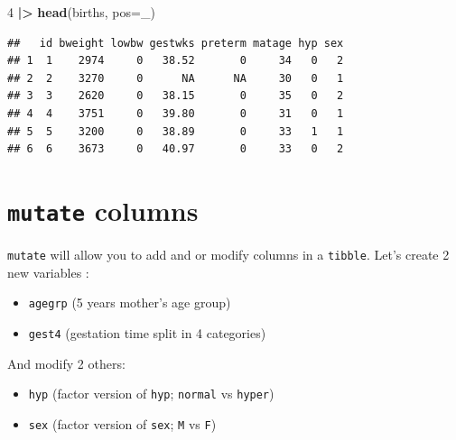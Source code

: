 \documentclass[
]{book}
\newenvironment{Shaded}{\begin{snugshade}}{\end{snugshade}}
\newcommand{\AttributeTok}[1]{\textcolor[rgb]{0.13,0.29,0.53}{#1}}
\newcommand{\DecValTok}[1]{\textcolor[rgb]{0.00,0.00,0.81}{#1}}
\newcommand{\FunctionTok}[1]{\textcolor[rgb]{0.13,0.29,0.53}{\textbf{#1}}}
\newcommand{\NormalTok}[1]{#1}
\newcommand{\SpecialCharTok}[1]{\textcolor[rgb]{0.81,0.36,0.00}{\textbf{#1}}}
\providecommand{\tightlist}{%
  \setlength{\itemsep}{0pt}\setlength{\parskip}{0pt}}
\theoremstyle{definition}
\theoremstyle{definition}
\theoremstyle{definition}
\theoremstyle{definition}
\theoremstyle{remark}
\begin{document}
\begin{Shaded}
\begin{Highlighting}[]
\DecValTok{4} \SpecialCharTok{|\textgreater{}} \FunctionTok{head}\NormalTok{(births, }\AttributeTok{pos=}\NormalTok{\_)}
\end{Highlighting}
\end{Shaded}

\begin{verbatim}
##   id bweight lowbw gestwks preterm matage hyp sex
## 1  1    2974     0   38.52       0     34   0   2
## 2  2    3270     0      NA      NA     30   0   1
## 3  3    2620     0   38.15       0     35   0   2
## 4  4    3751     0   39.80       0     31   0   1
## 5  5    3200     0   38.89       0     33   1   1
## 6  6    3673     0   40.97       0     33   0   2
\end{verbatim}

\section{\texorpdfstring{\texttt{mutate} columns}{mutate columns}}\label{mutate-columns}

\texttt{mutate} will allow you to add and or modify columns in a \texttt{tibble}.
Let's create 2 new variables :

\begin{itemize}
\tightlist
\item
  \texttt{agegrp} (5 years mother's age group)
\item
  \texttt{gest4} (gestation time split in 4 categories)
\end{itemize}

And modify 2 others:

\begin{itemize}
\tightlist
\item
  \texttt{hyp} (factor version of \texttt{hyp}; \texttt{normal} vs \texttt{hyper})
\item
  \texttt{sex} (factor version of \texttt{sex}; \texttt{M} vs \texttt{F})
\end{itemize}
\end{document}
